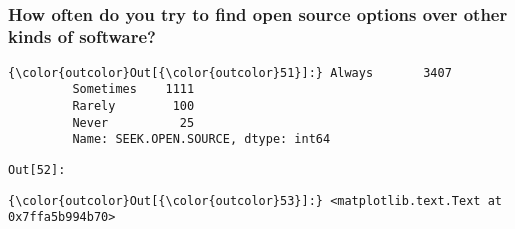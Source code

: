 \documentclass[11pt]{article}
\begin{document}
    


    \begin{center}
    \end{center}
    { \hspace*{\fill} \\}
    
    \subsubsection{How often do you try to find open source options over
other kinds of
software?}\label{how-often-do-you-try-to-find-open-source-options-over-other-kinds-of-software}


            \begin{Verbatim}[commandchars=\\\{\}]
{\color{outcolor}Out[{\color{outcolor}51}]:} Always       3407
         Sometimes    1111
         Rarely        100
         Never          25
         Name: SEEK.OPEN.SOURCE, dtype: int64
\end{Verbatim}
        
\texttt{\color{outcolor}Out[{\color{outcolor}52}]:}
    

    


            \begin{Verbatim}[commandchars=\\\{\}]
{\color{outcolor}Out[{\color{outcolor}53}]:} <matplotlib.text.Text at 0x7ffa5b994b70>
\end{Verbatim}
        
    \begin{center}
    \end{center}
    { \hspace*{\fill} \\}
    
\end{document}
